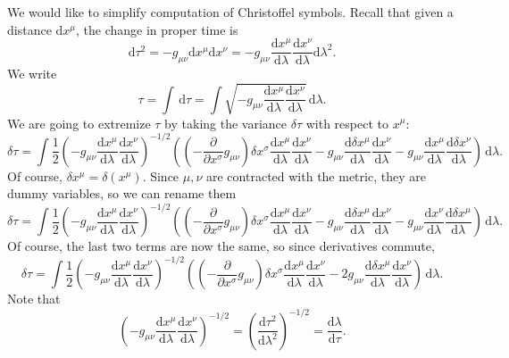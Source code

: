 We would like to simplify computation of Christoffel symbols. Recall that given a distance $\mathrm{d} x^\mu $, the change in proper time is
\[
	\mathrm{d} \tau ^2=-g_{\mu \nu } \mathrm{d} x^\mu \mathrm{d} x^\nu =-g_{\mu \nu } \frac{\mathrm{d}x^\mu }{\mathrm{d}\lambda } \frac{\mathrm{d}x^\nu }{\mathrm{d}\lambda } \mathrm{d} \lambda ^2	
.\]
We write
\[
	\tau =\int  \,\mathrm{d} \tau =\int \sqrt{-g_{\mu \nu } \frac{\mathrm{d}x^\mu }{\mathrm{d}\lambda } \frac{\mathrm{d}x^\nu }{\mathrm{d}\lambda } }  \,\mathrm{d} \lambda 
.\]
We are going to extremize $\tau $ by taking the variance $\delta \tau $ with respect to $x^\mu $:
\[
	\delta \tau =\int \frac{1}{2} \left( -g_{\mu \nu } \frac{\mathrm{d}x^\mu }{\mathrm{d}\lambda } \frac{\mathrm{d}x^\nu }{\mathrm{d}\lambda }  \right) ^{-1/2} \left( \left(-\frac{\partial }{\partial x^\sigma } g_{\mu \nu }  \right) \delta x^\sigma \frac{\mathrm{d}x^\mu }{\mathrm{d}\lambda } \frac{\mathrm{d}x^\nu }{\mathrm{d}\lambda } - g_{\mu \nu } \frac{\mathrm{d}\delta x^\mu }{\mathrm{d}\lambda } \frac{\mathrm{d}x^\nu }{\mathrm{d}\lambda } -g_{\mu \nu } \frac{\mathrm{d}x^\mu }{\mathrm{d}\lambda } \frac{\mathrm{d}\delta x^\nu }{\mathrm{d}\lambda } \right)\,\mathrm{d} \lambda 
.\]
Of course, $\delta x^\mu =\delta (x^\mu )$. Since $\mu ,\nu $ are contracted with the metric, they are dummy variables, so we can rename them
\[
	\delta \tau =\int \frac{1}{2} \left( -g_{\mu \nu } \frac{\mathrm{d}x^\mu }{\mathrm{d}\lambda } \frac{\mathrm{d}x^\nu }{\mathrm{d}\lambda }  \right) ^{-1/2} \left( \left(-\frac{\partial }{\partial x^\sigma } g_{\mu \nu }  \right) \delta x^\sigma \frac{\mathrm{d}x^\mu }{\mathrm{d}\lambda } \frac{\mathrm{d}x^\nu }{\mathrm{d}\lambda } - g_{\mu \nu } \frac{\mathrm{d}\delta x^\mu }{\mathrm{d}\lambda } \frac{\mathrm{d}x^\nu }{\mathrm{d}\lambda } -g_{\mu \nu } \frac{\mathrm{d}x^\nu  }{\mathrm{d}\lambda } \frac{\mathrm{d}\delta x^\mu  }{\mathrm{d}\lambda } \right)\,\mathrm{d} \lambda 
.\]
Of course, the last two terms are now the same, so since derivatives commute,
\[
	\delta \tau =\int \frac{1}{2} \left( -g_{\mu \nu } \frac{\mathrm{d}x^\mu }{\mathrm{d}\lambda } \frac{\mathrm{d}x^\nu }{\mathrm{d}\lambda }  \right) ^{-1/2} \left( \left(-\frac{\partial }{\partial x^\sigma } g_{\mu \nu }  \right) \delta x^\sigma \frac{\mathrm{d}x^\mu }{\mathrm{d}\lambda } \frac{\mathrm{d}x^\nu }{\mathrm{d}\lambda } - 2g_{\mu \nu } \frac{\mathrm{d}\delta x^\mu }{\mathrm{d}\lambda } \frac{\mathrm{d}x^\nu }{\mathrm{d}\lambda } \right)\,\mathrm{d} \lambda 
.\]
Note that
\[
	\left(-g_{\mu \nu } \frac{\mathrm{d}x^\mu }{\mathrm{d}\lambda } \frac{\mathrm{d}x^\nu }{\mathrm{d}\lambda } \right)^{-1/2} =\left( \frac{\mathrm{d}\tau ^2}{\mathrm{d}\lambda ^2}  \right) ^{-1/2} =\frac{\mathrm{d}\lambda }{\mathrm{d}\tau } 
.\]
